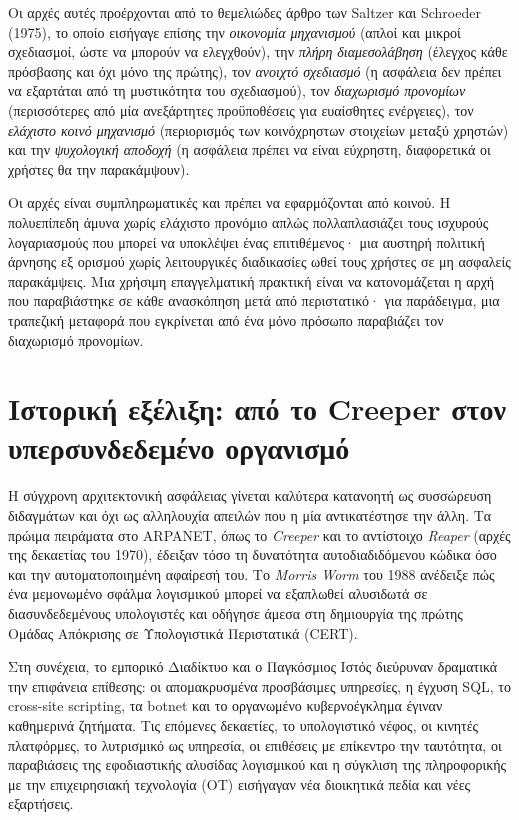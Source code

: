 \documentclass[11pt,openany]{book}
\begin{document}
Οι αρχές αυτές προέρχονται από το θεμελιώδες άρθρο των Saltzer και Schroeder (1975), το οποίο εισήγαγε επίσης την \emph{οικονομία μηχανισμού} (απλοί και μικροί σχεδιασμοί, ώστε να μπορούν να ελεγχθούν), την \emph{πλήρη διαμεσολάβηση} (έλεγχος κάθε πρόσβασης και όχι μόνο της πρώτης), τον \emph{ανοιχτό σχεδιασμό} (η ασφάλεια δεν πρέπει να εξαρτάται από τη μυστικότητα του σχεδιασμού), τον \emph{διαχωρισμό προνομίων} (περισσότερες από μία ανεξάρτητες προϋποθέσεις για ευαίσθητες ενέργειες), τον \emph{ελάχιστο κοινό μηχανισμό} (περιορισμός των κοινόχρηστων στοιχείων μεταξύ χρηστών) και την \emph{ψυχολογική αποδοχή} (η ασφάλεια πρέπει να είναι εύχρηστη, διαφορετικά οι χρήστες θα την παρακάμψουν).

Οι αρχές είναι συμπληρωματικές και πρέπει να εφαρμόζονται από κοινού. Η πολυεπίπεδη άμυνα χωρίς ελάχιστο προνόμιο απλώς πολλαπλασιάζει τους ισχυρούς λογαριασμούς που μπορεί να υποκλέψει ένας επιτιθέμενος· μια αυστηρή πολιτική άρνησης εξ ορισμού χωρίς λειτουργικές διαδικασίες ωθεί τους χρήστες σε μη ασφαλείς παρακάμψεις. Μια χρήσιμη επαγγελματική πρακτική είναι να κατονομάζεται η αρχή που παραβιάστηκε σε κάθε ανασκόπηση μετά από περιστατικό· για παράδειγμα, μια τραπεζική μεταφορά που εγκρίνεται από ένα μόνο πρόσωπο παραβιάζει τον διαχωρισμό προνομίων.

\section{Ιστορική εξέλιξη: από το Creeper στον υπερσυνδεδεμένο οργανισμό}\label{sec:1.4}
Η σύγχρονη αρχιτεκτονική ασφάλειας γίνεται καλύτερα κατανοητή ως συσσώρευση διδαγμάτων και όχι ως αλληλουχία απειλών που η μία αντικατέστησε την άλλη. Τα πρώιμα πειράματα στο ARPANET, όπως το \emph{Creeper} και το αντίστοιχο \emph{Reaper} (αρχές της δεκαετίας του 1970), έδειξαν τόσο τη δυνατότητα αυτοδιαδιδόμενου κώδικα όσο και την αυτοματοποιημένη αφαίρεσή του. Το \emph{Morris Worm} του 1988 ανέδειξε πώς ένα μεμονωμένο σφάλμα λογισμικού μπορεί να εξαπλωθεί αλυσιδωτά σε διασυνδεδεμένους υπολογιστές και οδήγησε άμεσα στη δημιουργία της πρώτης Ομάδας Απόκρισης σε Υπολογιστικά Περιστατικά (CERT).

Στη συνέχεια, το εμπορικό Διαδίκτυο και ο Παγκόσμιος Ιστός διεύρυναν δραματικά την επιφάνεια επίθεσης: οι απομακρυσμένα προσβάσιμες υπηρεσίες, η έγχυση SQL, το cross-site scripting, τα botnet και το οργανωμένο κυβερνοέγκλημα έγιναν καθημερινά ζητήματα. Τις επόμενες δεκαετίες, το υπολογιστικό νέφος, οι κινητές πλατφόρμες, το λυτρισμικό ως υπηρεσία, οι επιθέσεις με επίκεντρο την ταυτότητα, οι παραβιάσεις της εφοδιαστικής αλυσίδας λογισμικού και η σύγκλιση της πληροφορικής με την επιχειρησιακή τεχνολογία (OT) εισήγαγαν νέα διοικητικά πεδία και νέες εξαρτήσεις.
\end{document}
